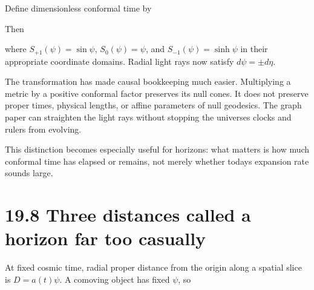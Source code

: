 \documentclass[
  11pt,
  letterpaper,
  oneside,
  openany]{scrbook}
\begin{document}
Define dimensionless conformal time by

\begin{center}
\begingroup
{}
\ifdim\wd\grmathbox>\linewidth
\resizebox{\linewidth}{!}{\usebox{\grmathbox}}
\else\usebox{\grmathbox}\fi
\endgroup
\end{center}

Then

\begin{center}
\begingroup
{}
\ifdim\wd\grmathbox>\linewidth
\resizebox{\linewidth}{!}{\usebox{\grmathbox}}
\else\usebox{\grmathbox}\fi
\endgroup
\end{center}

where \(S_{+1}(\psi)=\sin\psi\), \(S_0(\psi)=\psi\), and
\(S_{-1}(\psi)=\sinh\psi\) in their appropriate coordinate domains.
Radial light rays now satisfy \(d\psi=\pm d\eta\).

The transformation has made causal bookkeeping much easier. Multiplying
a metric by a positive conformal factor preserves its null cones. It
does not preserve proper times, physical lengths, or affine parameters
of null geodesics. The graph paper can straighten the light rays without
stopping the universe\textquotesingle s clocks and rulers from evolving.

This distinction becomes especially useful for horizons: what matters is
how much conformal time has elapsed or remains, not merely whether
today\textquotesingle s expansion rate sounds large.

\hypertarget{three-distances-called-a-horizon-far-too-casually}{%
\section{19.8 Three distances called a horizon far too
casually}\label{three-distances-called-a-horizon-far-too-casually}}

At fixed cosmic time, radial proper distance from the origin along a
spatial slice is \(D=a(t)\psi\). A comoving object has fixed \(\psi\),
so

\begin{center}
\begingroup
{}
\ifdim\wd\grmathbox>\linewidth
\resizebox{\linewidth}{!}{\usebox{\grmathbox}}
\else\usebox{\grmathbox}\fi
\endgroup
\end{center}
\end{document}
